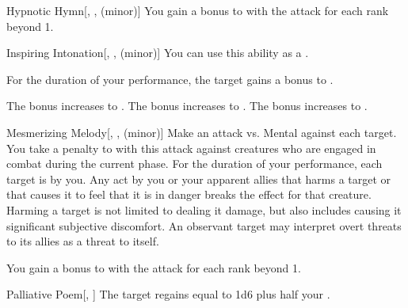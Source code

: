 {\begin{freeability}{Hypnotic Hymn}[, ,  (minor)]
                \rankline
                You gain a  bonus to  with the attack for each rank beyond 1.
            \end{freeability}

            \begin{freeability}{Inspiring Intonation}[, ,  (minor)]
                You can use this ability as a .

                For the duration of your performance, the target gains a  bonus to .

                \rankline
                 The bonus increases to .
                 The bonus increases to .
                 The bonus increases to .
            \end{freeability}

            \begin{freeability}{Mesmerizing Melody}[, ,  (minor)]
                Make an attack vs. Mental against each target.
                You take a  penalty to  with this attack against creatures who are engaged in combat during the current phase.
                \hit For the duration of your performance, each target is \fascinated by you.
                Any act by you or your apparent allies that harms a target or that causes it to feel that it is in danger breaks the effect for that creature.
                Harming a target is not limited to dealing it damage, but also includes causing it significant subjective discomfort.
                An observant target may interpret overt threats to its allies as a threat to itself.

                \rankline
                You gain a  bonus to  with the attack for each rank beyond 1.
            \end{freeability}

            \begin{freeability}{Palliative Poem}[, ]
                The target regains  equal to 1d6 plus half your .


\end{freeability}}
